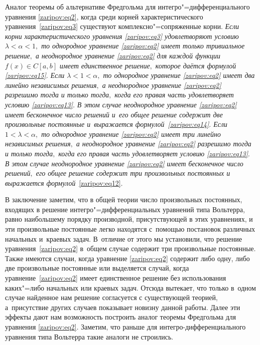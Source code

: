 {{\small \sc Аналог теоремы об альтернативе Фредгольма для интегро"=дифференциального уравнения \eqref{zaripov:eq2}, когда среди корней характеристического уравнения~\eqref{zaripov:eq3} существуют комплексно"=сопряженные корни.}
{\it  Если корни характеристического уравнения \eqref{zaripov:eq3} удовлетворяют условию $\lambda<\alpha<1,$ то однородное уравнение \eqref{zaripov:eq2} имеет только тривиальное решение$,$ а неоднородное уравнение \eqref{zaripov:eq2} для каждой функции $f(x)\in C[a,b]$  имеет единственное решение$,$ которое даётся формулой \eqref{zaripov:eq15}$.$ 
Если $\lambda<1<\alpha,$  то однородное уравнение \eqref{zaripov:eq2} имеет два линейно независимых решения$,$ а неоднородное уравнение \eqref{zaripov:eq2} разрешимо тогда и только тогда$,$ когда его правая часть удовлетворяет условию \eqref{zaripov:eq13}$.$ 
В этом  случае неоднородное уравнение \eqref{zaripov:eq2} имеет бесконечное число решений и~его общее решение содержит две произвольные постоянные и~выражается формулой~\eqref{zaripov:eq14}$.$ 
Если $1<\lambda<\alpha,$  то однородное уравнение \eqref{zaripov:eq2} имеет три линейно независимых решения$,$ а неоднородное уравнение \eqref{zaripov:eq2} разрешимо тогда и только тогда$,$ когда его правая часть удовлетворяет условию \eqref{zaripov:eq13}$.$ 
В этом  случае неоднородное уравнение \eqref{zaripov:eq2} имеет бесконечное число решений$,$  его общее решение содержит три произвольных постоянных и выражается формулой}~\eqref{zaripov:eq12}.

\smallskip

В заключение заметим, что в общей теории число произвольных постоянных, входящих в решение интегро"=дифференциальных уравнений типа Вольтерра, равно наибольшему порядку производной, присутствующей в этих уравнениях, и эти  произвольные  постоянные легко  находятся с~помощью постановок различных начальных и~краевых задач. 
В~отличие от этого мы установили, что решение уравнения~\eqref{zaripov:eq2} в~общем случае содержит три произвольные постоянные. 
Также имеются случаи, когда уравнение \eqref{zaripov:eq2} содержит либо одну, либо две произвольные постоянные или выделяется случай, когда уравнение~\eqref{zaripov:eq2} имеет единственное решение без использования каких"=либо начальных или краевых задач. 
Отсюда вытекает, что только в~одном случае найденное нам решение согласуется с существующей теорией, а~присутствие других случаев показывает новизну данной работы. 
Далее эти эффекты дают нам возможность построить аналог теоремы Фредгольма для уравнения \eqref{zaripov:eq2}. Заметим, что раньше для интегро-дифференциального уравнения типа Вольтерра такие аналоги не  строились.

}
